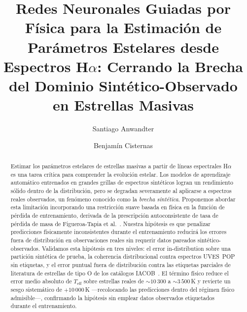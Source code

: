 \documentclass[sigconf,ACM]{acmart}
\begin{document}
\title{Redes Neuronales Guiadas por Física para la Estimación de Parámetros
Estelares desde Espectros H$\alpha$: Cerrando la Brecha del Dominio
Sintético-Observado en Estrellas Masivas}

\author{Santiago Anwandter}

\author{Benjamín Cisternas}

\renewcommand{\shortauthors}{Anwandter et al.}

\begin{abstract}
Estimar los parámetros estelares de estrellas masivas a partir de líneas espectrales H$\alpha$ es una tarea crítica para comprender la evolución estelar. Los modelos de aprendizaje automático entrenados en grandes grillas de espectros sintéticos logran un rendimiento sólido dentro de la distribución, pero se degradan severamente al aplicarse a espectros reales observados, un
fenómeno conocido como la \emph{brecha sintética}. Proponemos abordar esta limitación incorporando una restricción suave basada en física en la función de pérdida de entrenamiento, derivada de la prescripción autoconsistente de tasa de pérdida de masa de Figueroa-Tapia et al.~\cite{FigueroaTapia2026}. Nuestra hipótesis es que penalizar predicciones físicamente inconsistentes durante el entrenamiento reducirá los errores fuera de distribución en observaciones reales sin requerir datos pareados sintético-observados. Validamos esta hipótesis en tres niveles: el error in-distribution sobre una partición sintética de prueba, la coherencia distribucional contra espectros UVES~POP sin etiquetas, y el error puntual fuera de distribución contra las etiquetas parciales de literatura de estrellas de tipo O de los catálogos IACOB~\cite{Holgado2025,deBurgos2024}. El término físico reduce el error medio absoluto de $T_\mathrm{eff}$ sobre estrellas reales de ${\sim}10\,300$ a ${\sim}3\,500$\,K y revierte un sesgo sistemático de $+10\,000$\,K ---recolocando las predicciones dentro del régimen físico admisible---, confirmando la hipótesis sin emplear datos observados etiquetados durante el entrenamiento.
\end{abstract}
\end{document}

